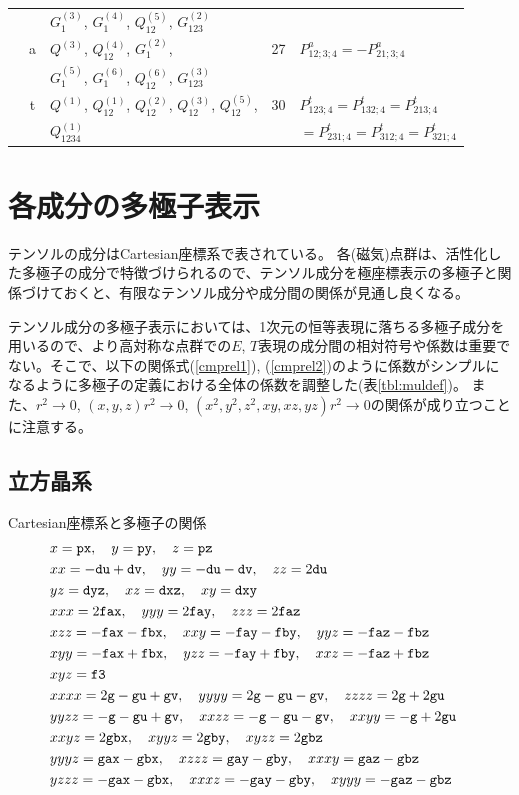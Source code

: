 \documentclass[11pt]{easymemo}
\begin{document}
\begin{table}[ht!]
\begin{center}
\begin{tabular}{cclcl}
  &   & $G_1^{(3)}$, $G_1^{(4)}$, $Q_{12}^{(5)}$, $G_{123}^{(2)}$ \\
  & a & $Q^{(3)}$, $Q_{12}^{(4)}$, $G_1^{(2)}$, & 27 & $P_{12;3;4}^{a}=-P_{21;3;4}^{a}$ \\
  &   & $G_1^{(5)}$, $G_1^{(6)}$, $Q_{12}^{(6)}$, $G_{123}^{(3)}$ & \\
  & t & $Q^{(1)}$, $Q_{12}^{(1)}$, $Q_{12}^{(2)}$, $Q_{12}^{(3)}$, $Q_{12}^{(5)}$, & 30 & $P_{123;4}^{t}=P_{132;4}^{t}=P_{213;4}^{t}$ \\
  &   & $Q_{1234}^{(1)}$ &    & $=P_{231;4}^{t}=P_{312;4}^{t}=P_{321;4}^{t}$ \\
  \hline\hline
\end{tabular}
\end{center}
\end{table}


\section{各成分の多極子表示}

テンソルの成分はCartesian座標系で表されている。
各(磁気)点群は、活性化した多極子の成分で特徴づけられるので、テンソル成分を極座標表示の多極子と関係づけておくと、有限なテンソル成分や成分間の関係が見通し良くなる。

テンソル成分の多極子表示においては、1次元の恒等表現に落ちる多極子成分を用いるので、より高対称な点群での$E$, $T$表現の成分間の相対符号や係数は重要でない。そこで、以下の関係式(\ref{cmprel1}), (\ref{cmprel2})のように係数がシンプルになるように多極子の定義における全体の係数を調整した(表\ref{tbl:muldef})。
また、$r^2\to0$, $(x,y,z)r^2\to0$, $(x^2,y^2,z^2,xy,xz,yz)r^2\to0$の関係が成り立つことに注意する。

\subsection{立方晶系}
Cartesian座標系と多極子の関係
\begin{align}
&
x=\texttt{px},
\quad
y=\texttt{py},
\quad
z=\texttt{pz}
\cr&
xx=-\texttt{du} + \texttt{dv},
\quad
yy=-\texttt{du} - \texttt{dv},
\quad
zz=2 \texttt{du}
\cr&
yz=\texttt{dyz},
\quad
xz=\texttt{dxz},
\quad
xy=\texttt{dxy}
\cr&
xxx=2 \texttt{fax},
\quad
yyy=2 \texttt{fay},
\quad
zzz=2 \texttt{faz}
\cr&
xzz=-\texttt{fax} - \texttt{fbx},
\quad
xxy=-\texttt{fay} - \texttt{fby},
\quad
yyz=-\texttt{faz} - \texttt{fbz}
\cr&
xyy= -\texttt{fax} + \texttt{fbx},
\quad
yzz= -\texttt{fay} + \texttt{fby},
\quad
xxz=-\texttt{faz} + \texttt{fbz}
\cr&
xyz=\texttt{f3}
\cr&
xxxx= 2 \texttt{g} - \texttt{gu} + \texttt{gv},
\quad
yyyy=2 \texttt{g} - \texttt{gu} -\texttt{gv},
\quad
zzzz= 2 \texttt{g} + 2\texttt{gu}
\cr&
yyzz= - \texttt{g} - \texttt{gu} + \texttt{gv},
\quad
xxzz = -\texttt{g} -\texttt{gu} -\texttt{gv},
\quad
xxyy= -\texttt{g} + 2 \texttt{gu}
\cr&
xxyz= 2 \texttt{gbx},
\quad
xyyz= 2 \texttt{gby},
\quad
xyzz = 2 \texttt{gbz}
\cr&
yyyz= \texttt{gax} - \texttt{gbx},
\quad
xzzz= \texttt{gay} - \texttt{gby},
\quad
xxxy= \texttt{gaz} - \texttt{gbz}
\cr&
yzzz= -\texttt{gax} - \texttt{gbx},
\quad
xxxz= -\texttt{gay} - \texttt{gby},
\quad
xyyy= -\texttt{gaz} - \texttt{gbz}
\label{cmprel1}
\end{align}
\end{document}

